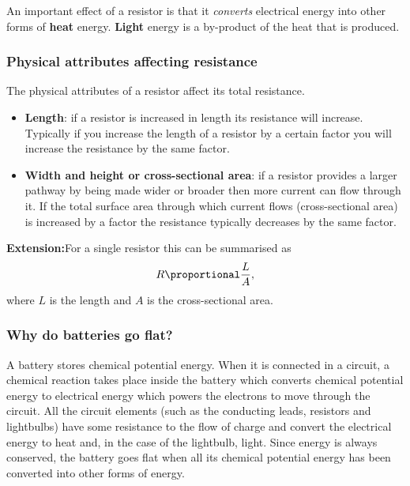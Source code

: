 An important effect of a resistor is that it \textit{converts} electrical
energy into other forms of \textbf{heat} energy. \textbf{Light} energy is a by-product of the heat that is produced.


\subsubsection{Physical attributes affecting resistance}

The physical attributes of a resistor affect its total resistance.
\begin{itemize}
 \item \textbf{Length}: if a resistor is increased in length its resistance will increase. Typically if you increase the length of a resistor by a certain factor you will increase the resistance by the same factor.
\item \textbf{Width and height or cross-sectional area}: if a resistor provides a larger pathway by being made wider or broader then more current can flow through it. If the total surface area through which current flows (cross-sectional area) is increased by a factor the resistance typically decreases by the same factor. 
\end{itemize}
\textbf{Extension:}For a single resistor this can be summarised as
\begin{equation*}
 R\proportional\frac{L}{A},
\end{equation*} where $L$ is the length and $A$ is the cross-sectional area.

\subsubsection*{Why do batteries go flat?}
A battery stores chemical potential energy. When it is connected in a circuit, a chemical reaction takes place inside the battery which converts chemical potential energy to electrical energy which powers the electrons to move through the circuit. All the circuit elements (such as the conducting leads, resistors and lightbulbs) have some resistance to the flow of charge and convert the electrical energy to heat and, in the case of the lightbulb, light.
Since energy is always conserved, the battery goes flat when all its chemical potential energy has been converted into other forms of energy.

